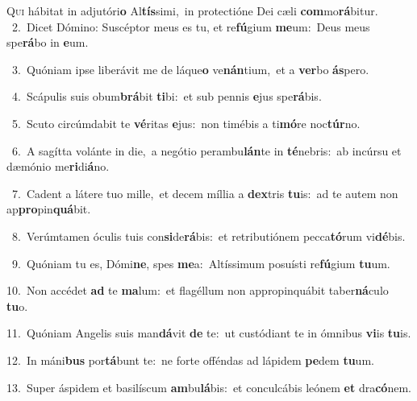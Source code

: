 \lettrine{\initial\textcolor{\initialcolor}{Q}}{ui} hábitat in adjutóri\textbf{o} Al\-\textbf{tís}\-simi,~\star in protectióne Dei cæli \textbf{com}\-mo\-\textbf{rá}\-bitur.\\
{\numbfont\textcolor{\numbcolor}{~2.}}~Dicet Dómino: Suscéptor meus es tu, et re\-\textbf{fú}\-gium \textbf{me}\-um:~\star Deus meus spe\-\textbf{rá}\-bo in \textbf{e}\-um.\par
{\numbfont\textcolor{\numbcolor}{~3.}}~Quóniam ipse liberávit me de láque\textbf{o} ve\-\textbf{nán}\-tium,~\star et a \textbf{ver}\-bo \textbf{ás}\-pero.\par
{\numbfont\textcolor{\numbcolor}{~4.}}~Scápulis suis obum\-\textbf{brá}\-bit \textbf{ti}\-bi:~\star et sub pennis \textbf{e}\-jus spe\-\textbf{rá}\-bis.\par
{\numbfont\textcolor{\numbcolor}{~5.}}~Scuto circúmdabit te \textbf{vé}\-ritas \textbf{e}\-jus:~\star non timébis a ti\-\textbf{mó}\-re noc\-\textbf{túr}\-no.\par
{\numbfont\textcolor{\numbcolor}{~6.}}~A sagítta volánte in die,~\dagger a negótio perambu\-\textbf{lán}\-te in \textbf{té}\-nebris:~\star ab incúrsu et dæmónio me\-\textbf{ri}\-di\-\textbf{á}\-no.\par
{\numbfont\textcolor{\numbcolor}{~7.}}~Cadent a látere tuo mille,~\dagger et decem míllia a \textbf{dex}\-tris \textbf{tu}\-is:~\star ad te autem non ap\-\textbf{pro}\-pin\-\textbf{quá}\-bit.\par
{\numbfont\textcolor{\numbcolor}{~8.}}~Verúmtamen óculis tuis con\-\textbf{si}\-de\-\textbf{rá}\-bis:~\star et retributiónem pecca\-\textbf{tó}\-rum vi\-\textbf{dé}\-bis.\par
{\numbfont\textcolor{\numbcolor}{~9.}}~Quóniam tu es, Dómi\-\textbf{ne}\-, spes \textbf{me}\-a:~\star Altíssimum posuísti re\-\textbf{fú}\-gium \textbf{tu}\-um.\par
{\numbfont\textcolor{\numbcolor}{10.}}~Non accédet \textbf{ad} te \textbf{ma}\-lum:~\star et flagéllum non appropinquábit taber\-\textbf{ná}\-culo \textbf{tu}\-o.\par
{\numbfont\textcolor{\numbcolor}{11.}}~Quóniam Angelis suis man\-\textbf{dá}\-vit \textbf{de} te:~\star ut custódiant te in ómnibus \textbf{vi}\-is \textbf{tu}\-is.\par
{\numbfont\textcolor{\numbcolor}{12.}}~In máni\textbf{bus} por\-\textbf{tá}\-bunt te:~\star ne forte offéndas ad lápidem \textbf{pe}\-dem \textbf{tu}\-um.\par
{\numbfont\textcolor{\numbcolor}{13.}}~Super áspidem et basilíscum \textbf{am}\-bu\-\textbf{lá}\-bis:~\star et conculcábis leónem \textbf{et} dra\-\textbf{có}\-nem.\par
